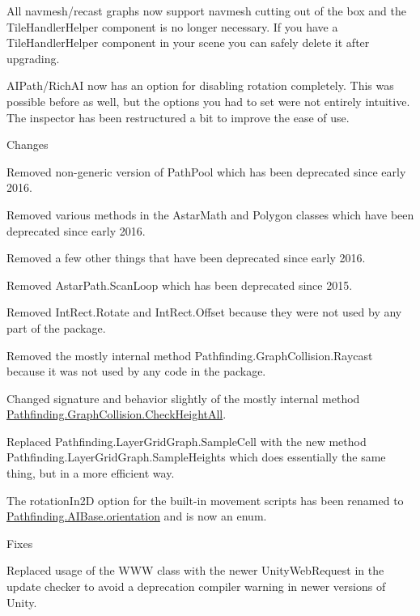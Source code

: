 \begin{DoxyItemize}
\begin{DoxyItemize}
\begin{DoxyItemize}
\item All navmesh/recast graphs now support navmesh cutting out of the box and the Tile\+Handler\+Helper component is no longer necessary. If you have a Tile\+Handler\+Helper component in your scene you can safely delete it after upgrading.
\item A\+I\+Path/\+Rich\+AI now has an option for disabling rotation completely. This was possible before as well, but the options you had to set were not entirely intuitive. The inspector has been restructured a bit to improve the ease of use.
\end{DoxyItemize}
\item Changes
\begin{DoxyItemize}
\item Removed non-\/generic version of Path\+Pool which has been deprecated since early 2016.
\item Removed various methods in the Astar\+Math and Polygon classes which have been deprecated since early 2016.
\item Removed a few other things that have been deprecated since early 2016.
\item Removed Astar\+Path.\+Scan\+Loop which has been deprecated since 2015.
\item Removed Int\+Rect.\+Rotate and Int\+Rect.\+Offset because they were not used by any part of the package.
\item Removed the mostly internal method Pathfinding.\+Graph\+Collision.\+Raycast because it was not used by any code in the package.
\item Changed signature and behavior slightly of the mostly internal method \mbox{\hyperlink{class_pathfinding_1_1_graph_collision_a3feefd373bc2c1f5b3777e64de847ad1}{Pathfinding.\+Graph\+Collision.\+Check\+Height\+All}}.
\item Replaced Pathfinding.\+Layer\+Grid\+Graph.\+Sample\+Cell with the new method Pathfinding.\+Layer\+Grid\+Graph.\+Sample\+Heights which does essentially the same thing, but in a more efficient way.
\item The rotation\+In2D option for the built-\/in movement scripts has been renamed to \mbox{\hyperlink{class_pathfinding_1_1_a_i_base_a245eab909f55d83dcbd3ca6262d778af}{Pathfinding.\+A\+I\+Base.\+orientation}} and is now an enum.
\end{DoxyItemize}
\item Fixes
\begin{DoxyItemize}
\item Replaced usage of the W\+WW class with the newer Unity\+Web\+Request in the update checker to avoid a deprecation compiler warning in newer versions of Unity.

\end{DoxyItemize}
\end{DoxyItemize}
\end{DoxyItemize}
